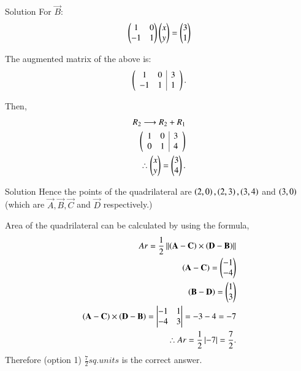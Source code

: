 \documentclass{beamer}
\begin{document}
\begin{frame}{Solution}
For $\vec{B}$:
\begin{align}
\begin{pmatrix}1 & 0 \\ 
-1 & 1\end{pmatrix}
\begin{pmatrix}x\\y\end{pmatrix}=\begin{pmatrix}3\\1\end{pmatrix}
\end{align}

The augmented matrix of the above is:
\begin{align}
\begin{pmatrix}\begin{array}{cc|c}
1 & 0 & 3 \\ 
-1 & 1 & 1
\end{array}\end{pmatrix}.
\end{align}

Then, 
\begin{align}
    R_2 \longrightarrow R_2 + R_1 \\
  \begin{pmatrix}\begin{array}{cc|c}
1 & 0 & 3 \\ 
0 & 1 & 4
\end{array}\end{pmatrix}\\
\therefore  \begin{pmatrix}x\\y\end{pmatrix}=\begin{pmatrix}3\\4\end{pmatrix}.
\end{align}
\end{frame}

\begin{frame}{Solution}
Hence the points of the quadrilateral are $\left(2,0\right),\left(2,3\right),\left(3,4\right)$ and $\left(3,0\right)$ (which are $\vec{A},\vec{B},\vec{C}$ and $\vec{D}$ respectively.)

 Area of the quadrilateral can be calculated by using the formula,
 \begin{align}
 Ar=\frac{1}{2}\left\|\left(\mathbf{A}-\mathbf{C}\right)\times\left(\mathbf{D}-\mathbf{B}\right)\right\|\\
 \left(\mathbf{A}-\mathbf{C}\right)=\begin{pmatrix}-1\\-4\end{pmatrix}   \\\left(\mathbf{B}-\mathbf{D}\right)=\begin{pmatrix}1\\3\end{pmatrix}  \\
 \left(\mathbf{A}-\mathbf{C}\right)\times\left(\mathbf{D}-\mathbf{B}\right)=\begin{vmatrix}-1&1 \\-4&3\end{vmatrix}=-3-4=-7\\
 \therefore Ar=\frac{1}{2}\left|-7\right|=\frac{7}{2}.
 \end{align}
 Therefore (option 1) $\frac{7}{2} sq.units$ is the correct answer.
\end{frame}
\end{document}
